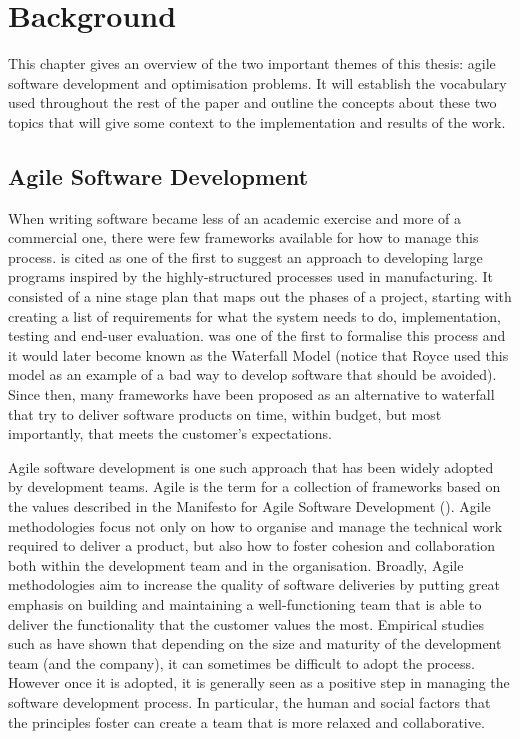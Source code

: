 
\chapter{Background}\label{ChapterBackground}

This chapter gives an overview of the two important themes of this thesis: agile software development and optimisation problems. It will establish the vocabulary used throughout the rest of the paper and outline the concepts about these two topics that will give some context to the implementation and results of the work.

\section{Agile Software Development}

When writing software became less of an academic exercise and more of a commercial one, there were few frameworks available for how to manage this process. \citet{benington1983production} is cited as one of the first to suggest an approach to developing large programs inspired by the highly-structured processes used in manufacturing. It consisted of a nine stage plan that maps out the phases of a project, starting with creating a list of requirements for what the system needs to do, implementation, testing and end-user evaluation. \citet{royce1987managing} was one of the first to formalise this process and it would later become known as the Waterfall Model (notice that Royce used this model as an example of a bad way to develop software that should be avoided). Since then, many frameworks have been proposed as an alternative to waterfall that try to deliver software products on time, within budget, but most importantly, that meets the customer's expectations.

Agile software development is one such approach that has been widely adopted by development teams. Agile is the term for a collection of frameworks based on the values described in the Manifesto for Agile Software Development (\citet{beck2001manifesto}). Agile methodologies focus not only on how to organise and manage the technical work required to deliver a product, but also how to foster cohesion and collaboration both within the development team and in the organisation. Broadly, Agile methodologies aim to increase the quality of software deliveries by putting great emphasis on building and maintaining a well-functioning team that is able to deliver the functionality that the customer values the most. Empirical studies such as \citet{dybaa2008empirical} have shown that depending on the size and maturity of the development team (and the company), it can sometimes be difficult to adopt the process. However once it is adopted, it is generally seen as a positive step in managing the software development process. In particular, the human and social factors that the principles foster can create a team that is more relaxed and collaborative.


